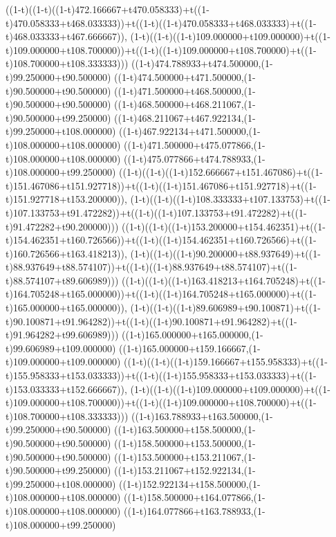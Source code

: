 ((1-t)((1-t)((1-t)472.166667+t470.058333)+t((1-t)470.058333+t468.033333))+t((1-t)((1-t)470.058333+t468.033333)+t((1-t)468.033333+t467.666667)),                                     (1-t)((1-t)((1-t)109.000000+t109.000000)+t((1-t)109.000000+t108.700000))+t((1-t)((1-t)109.000000+t108.700000)+t((1-t)108.700000+t108.333333)))
((1-t)474.788933+t474.500000,(1-t)99.250000+t90.500000)
((1-t)474.500000+t471.500000,(1-t)90.500000+t90.500000)
((1-t)471.500000+t468.500000,(1-t)90.500000+t90.500000)
((1-t)468.500000+t468.211067,(1-t)90.500000+t99.250000)
((1-t)468.211067+t467.922134,(1-t)99.250000+t108.000000)
((1-t)467.922134+t471.500000,(1-t)108.000000+t108.000000)
((1-t)471.500000+t475.077866,(1-t)108.000000+t108.000000)
((1-t)475.077866+t474.788933,(1-t)108.000000+t99.250000)
((1-t)((1-t)((1-t)152.666667+t151.467086)+t((1-t)151.467086+t151.927718))+t((1-t)((1-t)151.467086+t151.927718)+t((1-t)151.927718+t153.200000)),                                     (1-t)((1-t)((1-t)108.333333+t107.133753)+t((1-t)107.133753+t91.472282))+t((1-t)((1-t)107.133753+t91.472282)+t((1-t)91.472282+t90.200000)))
((1-t)((1-t)((1-t)153.200000+t154.462351)+t((1-t)154.462351+t160.726566))+t((1-t)((1-t)154.462351+t160.726566)+t((1-t)160.726566+t163.418213)),                                     (1-t)((1-t)((1-t)90.200000+t88.937649)+t((1-t)88.937649+t88.574107))+t((1-t)((1-t)88.937649+t88.574107)+t((1-t)88.574107+t89.606989)))
((1-t)((1-t)((1-t)163.418213+t164.705248)+t((1-t)164.705248+t165.000000))+t((1-t)((1-t)164.705248+t165.000000)+t((1-t)165.000000+t165.000000)),                                     (1-t)((1-t)((1-t)89.606989+t90.100871)+t((1-t)90.100871+t91.964282))+t((1-t)((1-t)90.100871+t91.964282)+t((1-t)91.964282+t99.606989)))
((1-t)165.000000+t165.000000,(1-t)99.606989+t109.000000)
((1-t)165.000000+t159.166667,(1-t)109.000000+t109.000000)
((1-t)((1-t)((1-t)159.166667+t155.958333)+t((1-t)155.958333+t153.033333))+t((1-t)((1-t)155.958333+t153.033333)+t((1-t)153.033333+t152.666667)),                                     (1-t)((1-t)((1-t)109.000000+t109.000000)+t((1-t)109.000000+t108.700000))+t((1-t)((1-t)109.000000+t108.700000)+t((1-t)108.700000+t108.333333)))
((1-t)163.788933+t163.500000,(1-t)99.250000+t90.500000)
((1-t)163.500000+t158.500000,(1-t)90.500000+t90.500000)
((1-t)158.500000+t153.500000,(1-t)90.500000+t90.500000)
((1-t)153.500000+t153.211067,(1-t)90.500000+t99.250000)
((1-t)153.211067+t152.922134,(1-t)99.250000+t108.000000)
((1-t)152.922134+t158.500000,(1-t)108.000000+t108.000000)
((1-t)158.500000+t164.077866,(1-t)108.000000+t108.000000)
((1-t)164.077866+t163.788933,(1-t)108.000000+t99.250000)
